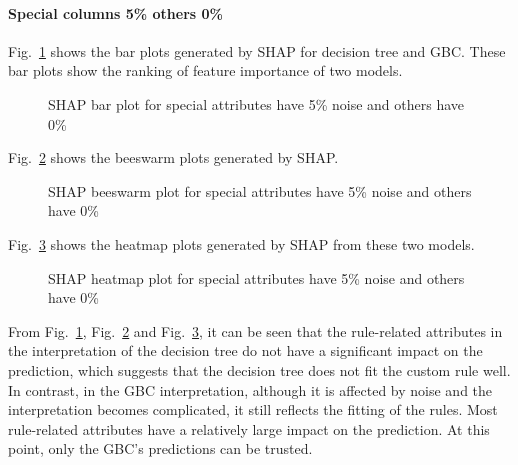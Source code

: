 \documentclass[runningheads,a4paper]{llncs}
\begin{document}
\paragraph{Special columns 5\% others 0\%}
Fig.~\ref{bar plots special_higher 5} shows the bar plots generated by SHAP for decision tree and GBC. These bar plots show the ranking of feature importance of two models.
\begin{figure}[H]
	\centering
	
	\hfill
	
	
	\caption{SHAP bar plot for special attributes have 5\% noise and others have 0\% }
	\label{bar plots special_higher 5}
\end{figure}
Fig.~\ref{bee plots special_higher 5} shows the beeswarm plots generated by SHAP.
\begin{figure}[H]
	\centering
	
	\hfill
	
	
	\caption{SHAP beeswarm plot for special attributes have 5\% noise and others have 0\% }
	\label{bee plots special_higher 5}
	
\end{figure}
Fig.~\ref{heat plots special_higher 5} shows the heatmap plots generated by SHAP from these two models.
\begin{figure}[H]
	\centering
	
	\hfill
	
	
	\caption{SHAP heatmap plot for special attributes have 5\% noise and others have 0\% }
	\label{heat plots special_higher 5}
	
\end{figure}

From Fig.~\ref{bar plots special_higher 5}, Fig.~\ref{bee plots special_higher 5} and Fig.~\ref{heat plots special_higher 5}, it can be seen that the rule-related attributes in the interpretation of the decision tree do not have a significant impact on the prediction, which suggests that the decision tree does not fit the custom rule well. In contrast, in the GBC interpretation, although it is affected by noise and the interpretation becomes complicated, it still reflects the fitting of the rules. Most rule-related attributes have a relatively large impact on the prediction.
At this point, only the GBC's predictions can be trusted.
\end{document}
